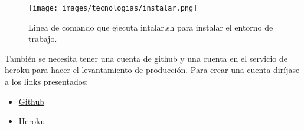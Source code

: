 \begin{figure}[H]
  \centering
  \texttt{[image: images/tecnologias/instalar.png]}
  \caption{Linea de comando que ejecuta intalar.sh para instalar el entorno de trabajo.}
\end{figure}


También se necesita tener una cuenta de github y una cuenta en el servicio de heroku para hacer el levantamiento de producción. Para crear una cuenta diríjase a los links presentados:
\begin{itemize}
  \item \href{htt://codigofacilito.com/articulos/como-crear-una-cuenta-y-un-repo-en-github}{Github}
  \item \href{https://signup.heroku.com/dc}{Heroku}
\end{itemize}
